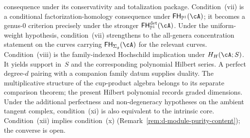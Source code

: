\begin{theorem}
consequence under its conservativity and totalization package.
Condition~\textup{(vii)} is a conditional factorization-homology
consequence under $\mathsf{FH}_{\mathbb{P}^1}(\cA)$; it becomes a
genus-$0$ criterion precisely under the stronger
$\mathsf{FH}^{\mathrm{det}}_{\mathbb{P}^1}(\cA)$.
Under the uniform-weight hypothesis, condition~\textup{(vii)} strengthens to
the all-genera concentration statement on the curves carrying
$\mathsf{FH}_{\Sigma_g}(\cA)$ for the relevant curves.
Condition~\textup{(viii)} is the family-indexed Hochschild implication
under $H_H(\cA;S)$.  It yields support in~$S$ and the corresponding
polynomial Hilbert series.  A perfect degree-$d$ pairing with a
companion family datum supplies duality.  The multiplicative structure
of the cup-product algebra belongs to its separate comparison theorem;
the present Hilbert polynomial records graded dimensions.
Under the additional perfectness and non-degeneracy hypotheses on the
ambient tangent complex, condition~\textup{(xi)} is also equivalent to
the intrinsic core. Condition~\textup{(xii)} implies condition~\textup{(x)}
(Remark~\ref{rem:d-module-purity-content}); the converse is open.


\end{theorem}
